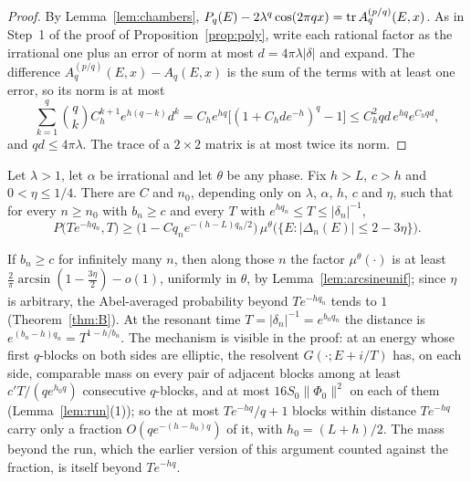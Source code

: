 \begin{proof}
By Lemma~\ref{lem:chambers}, $P_q(E)-2\lambda^q\cos(2\pi qx)=\operatorname{tr} A^{(p/q)}_q(E,x)$. As in Step~1 of the proof of Proposition~\ref{prop:poly}, write each rational factor as the irrational one plus an error of norm at most $d=4\pi\lambda|\delta|$ and expand. The difference $A^{(p/q)}_q(E,x)-A_q(E,x)$ is the sum of the terms with at least one error, so its norm is at most
\[
\sum_{k=1}^q\binom qkC_h^{k+1}e^{h(q-k)}d^k=C_he^{hq}\bigl[(1+C_hde^{-h})^q-1\bigr]\le C_h^2qd\,e^{hq}e^{C_hqd},
\]
and $qd\le4\pi\lambda$. The trace of a $2\times2$ matrix is at most twice its norm.
\end{proof}

\begin{theorem}\label{thm:fraction}
Let $\lambda>1$, let $\alpha$ be irrational and let $\theta$ be any phase. Fix $h>L$, $c>h$ and $0<\eta\le1/4$. There are $C$ and $n_0$, depending only on $\lambda$, $\alpha$, $h$, $c$ and $\eta$, such that for every $n\ge n_0$ with $b_n\ge c$ and every $T$ with $e^{hq_n}\le T\le|\delta_n|^{-1}$,
\[
P\bigl(Te^{-hq_n},T\bigr)\ge\bigl(1-Cq_ne^{-(h-L)q_n/2}\bigr)\,\mu^\theta\bigl(\{E:|\Delta_n(E)|\le2-3\eta\}\bigr).
\]
\end{theorem}

If $b_n\ge c$ for infinitely many $n$, then along those $n$ the factor $\mu^\theta(\cdot)$ is at least $\frac2\pi\arcsin(1-\frac{3\eta}2)-o(1)$, uniformly in $\theta$, by Lemma~\ref{lem:arcsineunif}; since $\eta$ is arbitrary, the Abel-averaged probability beyond $Te^{-hq_n}$ tends to $1$ (Theorem~\ref{thm:B}). At the resonant time $T=|\delta_n|^{-1}=e^{b_nq_n}$ the distance is $e^{(b_n-h)q_n}=T^{1-h/b_n}$. The mechanism is visible in the proof: at an energy whose first $q$-blocks on both sides are elliptic, the resolvent $G(\cdot;E+i/T)$ has, on each side, comparable mass on every pair of adjacent blocks among at least $c'T/(qe^{h_0q})$ consecutive $q$-blocks, and at most $16S_0\|\Phi_0\|^2$ on each of them (Lemma~\ref{lem:run}(1)); so the at most $Te^{-hq}/q+1$ blocks within distance $Te^{-hq}$ carry only a fraction $O(qe^{-(h-h_0)q})$ of it, with $h_0=(L+h)/2$. The mass beyond the run, which the earlier version of this argument counted against the fraction, is itself beyond $Te^{-hq}$.

